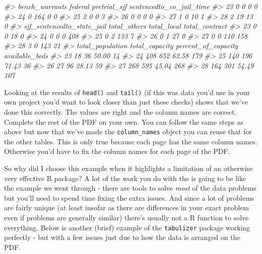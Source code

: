 \documentclass[
  12pt,
]{book}
\newenvironment{Shaded}{\begin{snugshade}}{\end{snugshade}}
\newcommand{\CommentTok}[1]{\textcolor[rgb]{0.56,0.35,0.01}{\textit{#1}}}
\begin{document}
\begin{Shaded}
\begin{Highlighting}[]
\CommentTok{\#>    bench\_warrants federal pretrial\_sjf sentencedto\_co\_jail\_time}
\CommentTok{\#> 23              0       0            0                        0}
\CommentTok{\#> 24              0     164            0                        0}
\CommentTok{\#> 25              2       0            0                        3}
\CommentTok{\#> 26              0       0            0                        0}
\CommentTok{\#> 27              1       0           10                        1}
\CommentTok{\#> 28              2      19           13                        0}
\CommentTok{\#>    sjf\_sentencedto\_state\_jail total\_others total\_local total\_contract}
\CommentTok{\#> 23                          0            0          18              0}
\CommentTok{\#> 24                          0            0           0            408}
\CommentTok{\#> 25                          0            2         133              7}
\CommentTok{\#> 26                          0            1          27              0}
\CommentTok{\#> 27                          0            0         110            158}
\CommentTok{\#> 28                          3            0         143             21}
\CommentTok{\#>    total\_population total\_capacity percent\_of\_capacity available\_beds}
\CommentTok{\#> 23               18             36               50.00             14}
\CommentTok{\#> 24              408            652               62.58            179}
\CommentTok{\#> 25              140            196               71.43             36}
\CommentTok{\#> 26               27             96               28.13             59}
\CommentTok{\#> 27              268            595               45.04            268}
\CommentTok{\#> 28              164            301               54.49            107}
\end{Highlighting}
\end{Shaded}

Looking at the results of \texttt{head()} and \texttt{tail()} (if this was data you'd use in your own project you'd want to look closer than just these checks) shows that we've done this correctly. The values are right and the column names are correct. Complete the rest of the PDF on your own. You can follow the same steps as above but now that we've made the \texttt{column\_names} object you can reuse that for the other tables. This is only true because each page has the same column names. Otherwise you'd have to fix the column names for each page of the PDF.

So why did I choose this example when it highlights a limitation of an otherwise very effective R package? A lot of the work you do with the is going to be like the example we went through - there are tools to solve \emph{most} of the data problems but you'll need to spend time fixing the extra issues. And since a lot of problems are fairly unique (at least insofar as there are differences in your exact problem even if problems are generally similar) there's usually not a R function to solve everything. Below is another (brief) example of the \texttt{tabulizer} package working perfectly - but with a few issues just due to how the data is arranged on the PDF.
\end{document}
